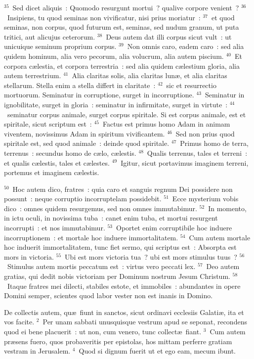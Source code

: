 ${}^{35}$~Sed dicet aliquis~: Quomodo resurgunt mortui~? qualive corpore venient~?
${}^{36}$~Insipiens, tu quod seminas non vivificatur, nisi prius moriatur~:
${}^{37}$~et quod seminas, non corpus, quod futurum est, seminas, sed nudum granum, ut puta tritici, aut alicujus ceterorum.
${}^{38}$~Deus autem dat illi corpus sicut vult~: ut unicuique seminum proprium corpus.
${}^{39}$~Non omnis caro, eadem caro~: sed alia quidem hominum, alia vero pecorum, alia volucrum, alia autem piscium.
${}^{40}$~Et corpora c\ae lestia, et corpora terrestria~: sed alia quidem c\ae lestium gloria, alia autem terrestrium.
${}^{41}$~Alia claritas solis, alia claritas lun\ae , et alia claritas stellarum. Stella enim a stella differt in claritate~:
${}^{42}$~sic et resurrectio mortuorum. Seminatur in corruptione, surget in incorruptione.
${}^{43}$~Seminatur in ignobilitate, surget in gloria~: seminatur in infirmitate, surget in virtute~:
${}^{44}$~seminatur corpus animale, surget corpus spiritale. Si est corpus animale, est et spiritale, sicut scriptum est~:
${}^{45}$~Factus est primus homo Adam in animam viventem, novissimus Adam in spiritum vivificantem.
${}^{46}$~Sed non prius quod spiritale est, sed quod animale~: deinde quod spiritale.
${}^{47}$~Primus homo de terra, terrenus~: secundus homo de c\ae lo, c\ae lestis.
${}^{48}$~Qualis terrenus, tales et terreni~: et qualis c\ae lestis, tales et c\ae lestes.
${}^{49}$~Igitur, sicut portavimus imaginem terreni, portemus et imaginem c\ae lestis.


${}^{50}$~Hoc autem dico, fratres~: quia caro et sanguis regnum Dei possidere non possunt~: neque corruptio incorruptelam possidebit.
${}^{51}$~Ecce mysterium vobis dico~: omnes quidem resurgemus, sed non omnes immutabimur.
${}^{52}$~In momento, in ictu oculi, in novissima tuba~: canet enim tuba, et mortui resurgent incorrupti~: et nos immutabimur.
${}^{53}$~Oportet enim corruptibile hoc induere incorruptionem~: et mortale hoc induere immortalitatem.
${}^{54}$~Cum autem mortale hoc induerit immortalitatem, tunc fiet sermo, qui scriptus est~: Absorpta est mors in victoria.
${}^{55}$~Ubi est mors victoria tua~? ubi est mors stimulus tuus~?
${}^{56}$~Stimulus autem mortis peccatum est~: virtus vero peccati lex.
${}^{57}$~Deo autem gratias, qui dedit nobis victoriam per Dominum nostrum Jesum Christum.
${}^{58}$~Itaque fratres mei dilecti, stabiles estote, et immobiles~: abundantes in opere Domini semper, scientes quod labor vester non est inanis in Domino.

\lettrine[lines=10,image=true,loversize=0.05,lraise=-0.03]{D}{}e collectis autem, qu\ae\ fiunt in sanctos, sicut ordinavi ecclesiis Galati\ae , ita et vos facite.
${}^{2}$~Per unam sabbati unusquisque vestrum apud se seponat, recondens quod ei bene placuerit~: ut non, cum venero, tunc collect\ae\ fiant.
${}^{3}$~Cum autem pr\ae sens fuero, quos probaveritis per epistolas, hos mittam perferre gratiam vestram in Jerusalem.
${}^{4}$~Quod si dignum fuerit ut et ego eam, mecum ibunt.


